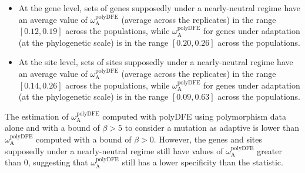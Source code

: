 \documentclass{article}
\newcommand{\rateApop}{\omega_{\mathrm{A}}}
\newcommand{\Spop}{\beta}
\begin{document}
    \begin{itemize}
        \item At the gene level, sets of genes supposedly under a nearly-neutral regime have an average value of $\rateApop^{\mathrm{polyDFE}}$ (average across the replicates) in the range $[0.12,0.19]$ across the populations, while $\rateApop^{\mathrm{polyDFE}}$ for genes under adaptation (at the phylogenetic scale) is in the range $[0.20,0.26]$ across the populations.
        \item At the site level, sets of sites supposedly under a nearly-neutral regime have an average value of $\rateApop^{\mathrm{polyDFE}}$ (average across the replicates) in the range $[0.14,0.26]$ across the populations, while $\rateApop^{\mathrm{polyDFE}}$ for genes under adaptation (at the phylogenetic scale) is in the range $[0.09,0.63]$ across the populations.
    \end{itemize}

    The estimation of $\rateApop^{\mathrm{polyDFE}}$ computed with polyDFE using polymorphism data alone and with a bound of $\Spop > 5$ to consider a mutation as adaptive\cite{galtier_adaptive_2016} is lower than $\rateApop^{\mathrm{polyDFE}}$ computed with a bound of $\Spop > 0$\cite{tataru_inference_2017}.
    However, the genes and sites supposedly under a nearly-neutral regime still have values of $\rateApop^{\mathrm{polyDFE}}$ greater than 0, suggesting that  $\rateApop^{\mathrm{polyDFE}}$ still has a lower specificity than the \textcite{mcdonald_adaptative_1991} statistic.

    \pagebreak
\end{document}
